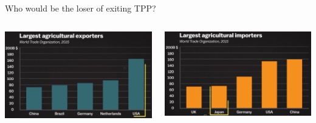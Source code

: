 \documentclass[10pt,hyperref={CJKbookmarks=true},xcolor=dvipsnames,aspectratio=169]{beamer}
\begin{document}
\begin{frame}{Who would be the loser of exiting TPP?}


\begin{columns}[onlytextwidth]
\begin{column}{0.45\textwidth}
\includegraphics[width=\columnwidth]{fig//trump6}
\end{column}
\begin{column}{0.45\textwidth}
\includegraphics[width=\columnwidth]{fig//trump7}
\end{column}
\end{columns}
\end{frame}
\end{document}

